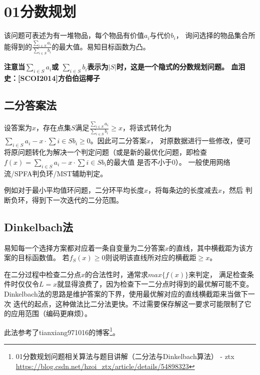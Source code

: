 \section{01分数规划}
该问题可表述为有一堆物品，每个物品有价值$a_i$与代价$b_i$，
询问选择的物品集合所能得到的$\displaystyle \frac{\sum_{i\in S}{a_i}}
	{\sum_{i\in S}{b_i}}$的最大值。易知目标函数为凸。

{\bfseries 注意当$\displaystyle \sum_{i\in S}{a_i}$或
$\displaystyle \sum_{i\in S}{b_i}$表示为$|S|$时，这是一个隐式的分数规划问题。
血泪史：[SCOI2014]方伯伯运椰子}

\subsection{二分答案法}

设答案为$x$，存在点集$S$满足$\displaystyle \frac{\sum_{i\in S}{a_i}}
	{\sum_{i\in S}{b_i}}\geq x$，将该式转化为$\displaystyle
	\sum_{i\in S}{a_i}-x\cdot \sum{i\in S}{b_i}\geq 0$。因此可二分答案$x$，
对原数据进行一些修改，便可将原问题转化为解决一个判定问题（或是新的最优化问题，即检查
$\displaystyle f(x)=\sum_{i\in S}{a_i}-x\cdot \sum{i\in S}{b_i}$的最大值
是否不小于0）。
一般使用网络流/SPFA判负环/MST辅助判定。

例如对于最小平均值环问题，二分环平均长度$x$，将每条边的长度减去$x$，然后
判断负环，得到下一次迭代的二分范围。

\subsection{Dinkelbach法}
易知每一个选择方案都对应着一条自变量为二分答案$x$的直线，其中横截距为该方案的目标函数值。
若$f_S(x)\geq 0$则说明该直线所对应的横截距$\geq x$。

在二分过程中检查二分点$x$的合法性时，通常求$max\{f(x)\}$来判定，
满足检查条件时仅仅令$L=x$就显得浪费了，因为检查下一二分点时得到的最优解可能不变。
Dinkelbach法的思路是维护答案的下界，使用最优解对应的直线横截距来当做下一次
迭代的起点，这种做法比二分法更快。不过需要保存解这一要求可能限制了它的应用范围（编码更麻烦）。

此法参考了tianxiang971016的博客\footnote{
	01分数规划问题相关算法与题目讲解（二分法与Dinkelbach算法） - ztx
	\url{https://blog.csdn.net/hzoi\_ztx/article/details/54898323}
}。

